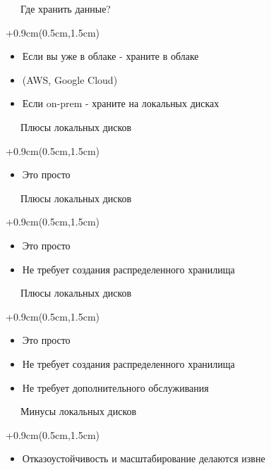 \documentclass[xetex,18pt,aspectratio=43]{beamer}
\begin{document}
\begin{Large}
\begin{frame}{\ \ \ Где хранить данные?}
\begin{textblock*}{\framewidth+0.9cm}(0.5cm,1.5cm)
\begin{itemize}
  \item Если вы уже в облаке - храните в облаке
  \item (AWS, Google Cloud)
  \item Если on-prem - храните на локальных дисках
\end{itemize}
\end{textblock*}
\end{frame}

\begin{frame}{\ \ \ Плюсы локальных дисков}
\begin{textblock*}{\framewidth+0.9cm}(0.5cm,1.5cm)
\begin{itemize}
  \item Это просто
\end{itemize}
\end{textblock*}
\end{frame}

\begin{frame}{\ \ \ Плюсы локальных дисков}
\begin{textblock*}{\framewidth+0.9cm}(0.5cm,1.5cm)
\begin{itemize}
  \item Это просто
  \item Не требует создания распределенного хранилища
\end{itemize}
\end{textblock*}
\end{frame}

\begin{frame}{\ \ \ Плюсы локальных дисков}
\begin{textblock*}{\framewidth+0.9cm}(0.5cm,1.5cm)
\begin{itemize}
  \item Это просто
  \item Не требует создания распределенного хранилища
  \item Не требует дополнительного обслуживания
\end{itemize}
\end{textblock*}
\end{frame}

\begin{frame}{\ \ \ Минусы локальных дисков}
\begin{textblock*}{\framewidth+0.9cm}(0.5cm,1.5cm)
\begin{itemize}
  \item Отказоустойчивость и масштабирование делаются извне
\end{itemize}
\end{textblock*}
\end{frame}


\end{Large}
\end{document}
